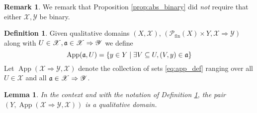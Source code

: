 \documentclass[12pt]{article}
\theoremstyle{plain}
\newtheorem{lemma}[thm]{Lemma}
\theoremstyle{definition}
\newtheorem{defn}[thm]{Definition} %
\newtheorem{remark}[thm]{Remark}
\newcommand{\scr}[1]{\mathscr{#1}}
\newcommand{\call}[1]{\mathcal{#1}}
\begin{document}
	\begin{remark}
		We remark that Proposition \ref{prop:abs_binary} did \emph{not} require that either $\scr{X},\scr{Y}$ be binary.
	\end{remark}
	
	\begin{defn}\label{def:app}
		Given qualitative domains $(X, \scr{X})$, $(\call{P}_{\text{fin}}(X) \times Y, \scr{X} \Rightarrow \scr{Y})$ along with $U \in \scr{X}, \frak{a} \in \scr{X} \Rightarrow \scr{Y}$ we define
		\begin{equation}\label{eq:app_def}
			\operatorname{App}(\frak{a}, U) = \{ y \in Y \mid \exists V \subseteq U, (V, y) \in \frak{a} \}
			\end{equation}
		Let $\operatorname{App}(\scr{X} \Rightarrow \scr{Y}, \scr{X})$ denote the collection of sets \eqref{eq:app_def} ranging over all $U \in \scr{X}$ and all $\frak{a} \in \scr{X} \Rightarrow \scr{Y}$.
		\end{defn}
	\begin{lemma}
		In the context and with the notation of Definition \ref{def:app}, the pair $(Y, \operatorname{App}(\scr{X} \Rightarrow \scr{Y}, \scr{X}))$ is a qualitative domain.
		\end{lemma}
\end{document}
